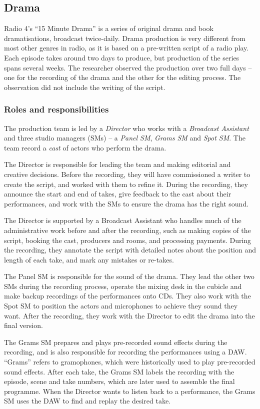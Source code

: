 \subsection{Drama}\label{sec:drama}
Radio 4's ``15 Minute Drama'' is a series of original drama and book dramatisations, broadcast twice-daily. Drama
production is very different from most other genres in radio, as it is based on a pre-written script of a radio play.
Each episode takes around two days to produce, but production of the series spans several weeks.  The researcher
observed the production over two full days -- one for the recording of the drama and the other for the editing process.
The observation did not include the writing of the script.

\subsubsection{Roles and responsibilities}
The production team is led by a \textit{Director} who works with a \textit{Broadcast Assistant} and three studio
managers (SMs) -- a \textit{Panel SM}, \textit{Grams SM} and \textit{Spot SM}. The team record a \textit{cast} of
actors who perform the drama.

The Director is responsible for leading the team and making editorial and creative decisions. Before the recording,
they will have commissioned a writer to create the script, and worked with them to refine it. During the recording,
they announce the start and end of takes, give feedback to the cast about their performances, and work with
the SMs to ensure the drama has the right sound.

The Director is supported by a Broadcast Assistant who handles much of the administrative work before and after the
recording, such as making copies of the script, booking the cast, producers and rooms, and processing payments.
During the recording, they annotate the script with detailed notes about the position and length of each take, and mark
any mistakes or re-takes.

The Panel SM is responsible for the sound of the drama. They lead the other two SMs during the recording process,
operate the mixing desk in the cubicle and make backup recordings of the performances onto CDs.  They also work with
the Spot SM to position the actors and microphones to achieve they sound they want.  After the recording, they work
with the Director to edit the drama into the final version.

The Grams SM prepares and plays pre-recorded sound effects during the recording, and is also responsible for recording
the performances using a DAW.  ``Grams'' refers to gramophones, which were historically used to play pre-recorded sound
effects.  After each take, the Grams SM labels the recording with the episode, scene and take numbers, which are later
used to assemble the final programme.  When the Director wants to listen back to a performance, the Grams SM uses the
DAW to find and replay the desired take.

